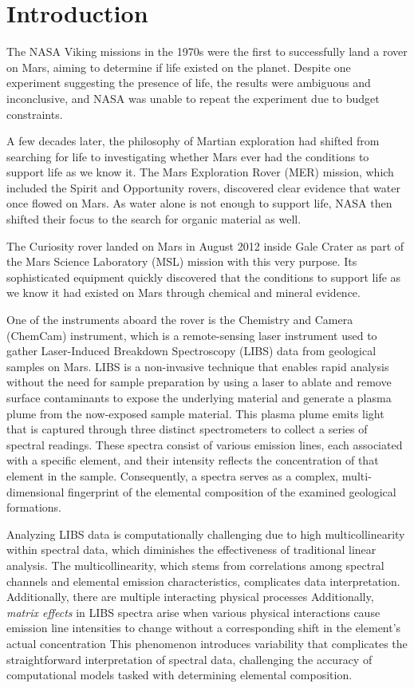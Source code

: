 \section{Introduction}\label{sec:introduction}
The NASA Viking missions in the 1970s were the first to successfully land a rover on Mars, aiming to determine if life existed on the planet.
Despite one experiment suggesting the presence of life, the results were ambiguous and inconclusive, and NASA was unable to repeat the experiment due to budget constraints\cite{marsnasagov_vikings}.

A few decades later, the philosophy of Martian exploration had shifted from searching for life to investigating whether Mars ever had the conditions to support life as we know it.
The Mars Exploration Rover (MER) mission, which included the Spirit and Opportunity rovers, discovered clear evidence that water once flowed on Mars.
As water alone is not enough to support life, NASA then shifted their focus to the search for organic material as well\cite{marsnasagov_observer, marsnasagov_spirit_opportunity}.

The Curiosity rover landed on Mars in August 2012 inside Gale Crater as part of the Mars Science Laboratory (MSL) mission with this very purpose.
Its sophisticated equipment quickly discovered that the conditions to support life as we know it had existed on Mars through chemical and mineral evidence.\cite{marsnasagov_chemcam}

One of the instruments aboard the rover is the Chemistry and Camera (ChemCam) instrument, which is a remote-sensing laser instrument used to gather Laser-Induced Breakdown Spectroscopy (LIBS) data from geological samples on Mars.
LIBS is a non-invasive technique that enables rapid analysis without the need for sample preparation by using a laser to ablate and remove surface contaminants to expose the underlying material and generate a plasma plume from the now-exposed sample material.
This plasma plume emits light that is captured through three distinct spectrometers to collect a series of spectral readings.
These spectra consist of various emission lines, each associated with a specific element, and their intensity reflects the concentration of that element in the sample.
Consequently, a spectra serves as a complex, multi-dimensional fingerprint of the elemental composition of the examined geological formations.\cite{cleggRecalibrationMarsScience2017}

Analyzing LIBS data is computationally challenging due to high multicollinearity within spectral data, which diminishes the effectiveness of traditional linear analysis.
The multicollinearity, which stems from correlations among spectral channels and elemental emission characteristics, complicates data interpretation.
Additionally, there are multiple interacting physical processes
Additionally, \textit{matrix effects} in LIBS spectra arise when various physical interactions cause emission line intensities to change without a corresponding shift in the element's actual concentration
This phenomenon introduces variability that complicates the straightforward interpretation of spectral data, challenging the accuracy of computational models tasked with determining elemental composition.\cite{andersonImprovedAccuracyQuantitative2017}

